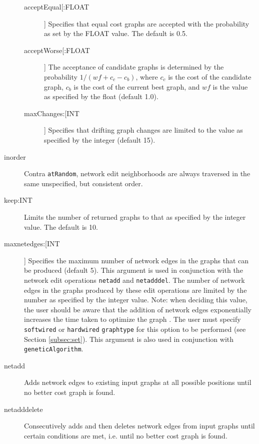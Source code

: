 \begin{description}
		\begin{description}
		
			\item[acceptEqual[:FLOAT]] Specifies that equal cost graphs are accepted with the
			probability as set by the FLOAT value. The default is 0.5.
			
			\item[acceptWorse[:FLOAT]] The acceptance of candidate graphs is determined by the 
			probability $1/ (wf + c_c - c_b)$, where $c_c$ is the cost of the candidate graph, $c_b$ 
			is the cost of the current best graph, and $wf$ is the value as specified by the float 
			(default 1.0).
			
			\item[maxChanges:[INT]] Specifies that drifting graph changes are limited to the 
			value as specified by the integer (default 15).

		\end{description}
		
		\item[inorder] Contra \texttt{atRandom}, network edit neighborhoods are always 
		traversed in the same unspecified, but consistent order.

		\item[keep:INT] Limits the number of returned graphs to that as specified by the 
		integer value. The default is 10.
		
		\item[maxnetedges:[INT]] Specifies the maximum number of network edges in the 
		graphs that can be produced (default 5). This argument is used in conjunction with the 
		network edit operations \texttt{netadd} and \texttt{netadddel}. The number of network 
		edges in the graphs produced by these edit operations are limited by the number as 
		specified by the integer value. Note: when deciding this value, the user should be 
		aware that the addition of network edges exponentially increases the time taken to 
		optimize the graph \cite{WheelerandWashburn2023}. The user must specify 
		\texttt{softwired} or \texttt{hardwired} \texttt{graphtype} for this option to be performed 
		(see Section \ref{subsec:set}). This argument is also used in conjunction with 
		\texttt{geneticAlgorithm}.
				
		\item[netadd] Adds network edges to existing input graphs at all possible positions 
		until no better cost graph is found.
		
		\item[netadddelete] Consecutively adds and then deletes network edges from 
		input graphs until certain conditions are met, i.e. until no better cost 	graph is found.
			

\end{description}
